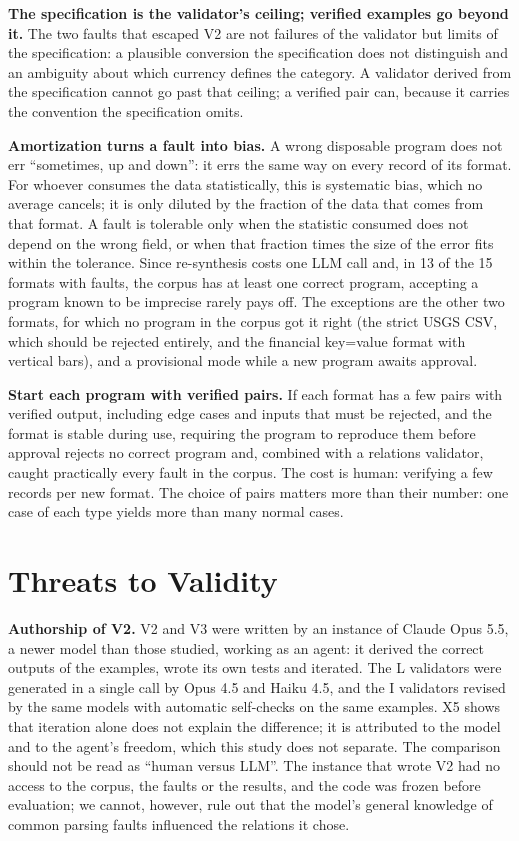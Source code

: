 \documentclass[sigconf,nonacm]{acmart}
\begin{document}
\textbf{The specification is the validator's ceiling; verified examples go beyond it.} The two faults that escaped V2 are not failures of the validator but limits of the specification: a plausible conversion the specification does not distinguish and an ambiguity about which currency defines the category. A validator derived from the specification cannot go past that ceiling; a verified pair can, because it carries the convention the specification omits.

\textbf{Amortization turns a fault into bias.} A wrong disposable program does not err ``sometimes, up and down'': it errs the same way on every record of its format. For whoever consumes the data statistically, this is systematic bias, which no average cancels; it is only diluted by the fraction of the data that comes from that format. A fault is tolerable only when the statistic consumed does not depend on the wrong field, or when that fraction times the size of the error fits within the tolerance. Since re-synthesis costs one LLM call and, in 13 of the 15 formats with faults, the corpus has at least one correct program, accepting a program known to be imprecise rarely pays off. The exceptions are the other two formats, for which no program in the corpus got it right (the strict USGS CSV, which should be rejected entirely, and the financial key=value format with vertical bars), and a provisional mode while a new program awaits approval.

\textbf{Start each program with verified pairs.} If each format has a few pairs with verified output, including edge cases and inputs that must be rejected, and the format is stable during use, requiring the program to reproduce them before approval rejects no correct program and, combined with a relations validator, caught practically every fault in the corpus. The cost is human: verifying a few records per new format. The choice of pairs matters more than their number: one case of each type yields more than many normal cases.

\section{Threats to Validity}
\label{sec:ameacas}

\textbf{Authorship of V2.} V2 and V3 were written by an instance of Claude Opus 5.5, a newer model than those studied, working as an agent: it derived the correct outputs of the examples, wrote its own tests and iterated. The L validators were generated in a single call by Opus 4.5 and Haiku 4.5, and the I validators revised by the same models with automatic self-checks on the same examples. X5 shows that iteration alone does not explain the difference; it is attributed to the model and to the agent's freedom, which this study does not separate. The comparison should not be read as ``human versus LLM''. The instance that wrote V2 had no access to the corpus, the faults or the results, and the code was frozen before evaluation; we cannot, however, rule out that the model's general knowledge of common parsing faults influenced the relations it chose.
\end{document}

